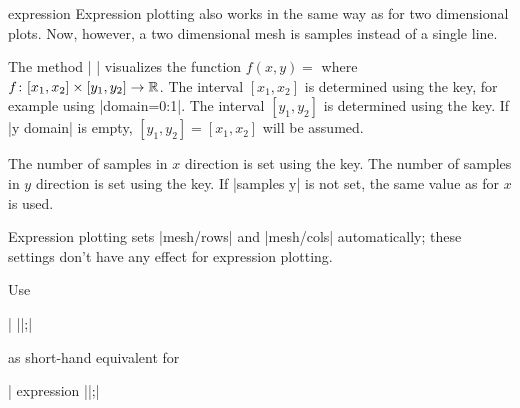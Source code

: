 \begin{addplot3operation}[]{expression }{}
\label{cmd:addplot3:expr}
	Expression plotting also works in the same way as for two dimensional plots. Now, however, a two dimensional mesh is samples instead of a single line.

	The method | | visualizes the function $f(x,y) = $ where $ f \colon [x_1,x_2] \times [y_1,y_2] \to \mathbb{R}$. The interval $[x_1,x_2]$ is determined using the  key, for example using |domain=0:1|. The interval $[y_1,y_2]$ is determined using the  key. If |y domain| is empty, $[y_1,y_2] = [x_1,x_2]$ will be assumed.

	The number of samples in $x$ direction is set using the  key. The number of samples in $y$ direction is set using the  key. If |samples y| is not set, the same value as for $x$ is used.

\begin{codeexample}[]
\end{codeexample}

\begin{codeexample}[]
\end{codeexample}

	Expression plotting sets |mesh/rows| and |mesh/cols| automatically; these settings don't have any effect for expression plotting.
\end{addplot3operation}

\begin{addplot3operation}[]{}{}
	Use

	| ||;|

	as short-hand equivalent for

	| expression ||;|
\end{addplot3operation}

